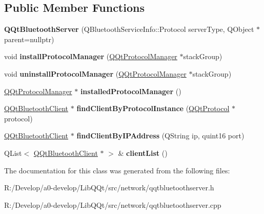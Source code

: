 \subsection*{Public Member Functions}
\begin{DoxyCompactItemize}
\item 
\mbox{\label{class_q_qt_bluetooth_server_aa35213134ad1c2a8bc1e087c18c33488}} 
{\bfseries Q\+Qt\+Bluetooth\+Server} (Q\+Bluetooth\+Service\+Info\+::\+Protocol server\+Type, Q\+Object $\ast$parent=nullptr)
\item 
\mbox{\label{class_q_qt_bluetooth_server_a9f36eb0c588ae5d8461e44c997715818}} 
void {\bfseries install\+Protocol\+Manager} (\mbox{\hyperlink{class_q_qt_protocol_manager}{Q\+Qt\+Protocol\+Manager}} $\ast$stack\+Group)
\item 
\mbox{\label{class_q_qt_bluetooth_server_a1f5faafde95521af1a47df8ff9b37326}} 
void {\bfseries uninstall\+Protocol\+Manager} (\mbox{\hyperlink{class_q_qt_protocol_manager}{Q\+Qt\+Protocol\+Manager}} $\ast$stack\+Group)
\item 
\mbox{\label{class_q_qt_bluetooth_server_a4e498ad2d5591b105f5f003b203d66c9}} 
\mbox{\hyperlink{class_q_qt_protocol_manager}{Q\+Qt\+Protocol\+Manager}} $\ast$ {\bfseries installed\+Protocol\+Manager} ()
\item 
\mbox{\label{class_q_qt_bluetooth_server_a2b879a13458862c4b7e00d759d44194f}} 
\mbox{\hyperlink{class_q_qt_bluetooth_client}{Q\+Qt\+Bluetooth\+Client}} $\ast$ {\bfseries find\+Client\+By\+Protocol\+Instance} (\mbox{\hyperlink{class_q_qt_protocol}{Q\+Qt\+Protocol}} $\ast$protocol)
\item 
\mbox{\label{class_q_qt_bluetooth_server_a99d504d5db2844f444ef8d3f74381292}} 
\mbox{\hyperlink{class_q_qt_bluetooth_client}{Q\+Qt\+Bluetooth\+Client}} $\ast$ {\bfseries find\+Client\+By\+I\+P\+Address} (Q\+String ip, quint16 port)
\item 
\mbox{\label{class_q_qt_bluetooth_server_aaea6ec50d5de2cfed0bd78fa7da42b8b}} 
Q\+List$<$ \mbox{\hyperlink{class_q_qt_bluetooth_client}{Q\+Qt\+Bluetooth\+Client}} $\ast$ $>$ \& {\bfseries client\+List} ()
\end{DoxyCompactItemize}


The documentation for this class was generated from the following files\+:\begin{DoxyCompactItemize}
\item 
R\+:/\+Develop/a0-\/develop/\+Lib\+Q\+Qt/src/network/qqtbluetoothserver.\+h\item 
R\+:/\+Develop/a0-\/develop/\+Lib\+Q\+Qt/src/network/qqtbluetoothserver.\+cpp\end{DoxyCompactItemize}

